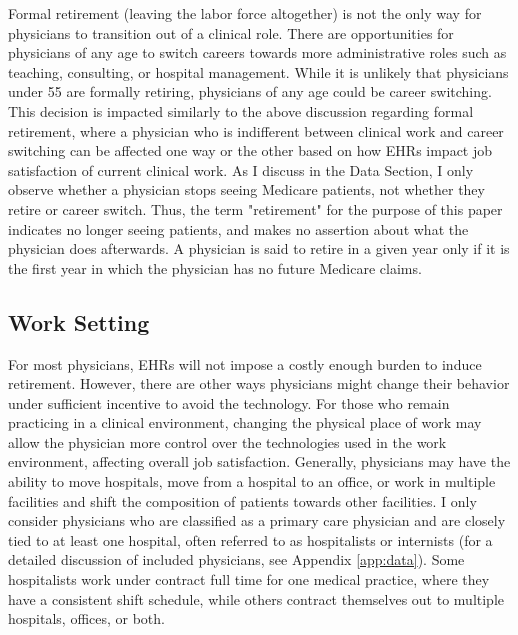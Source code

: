 \documentclass[11pt]{article}
\begin{document}
Formal retirement (leaving the labor force altogether) is not the only way for physicians to transition out of a clinical role. There are opportunities for physicians of any age to switch careers towards more administrative roles such as teaching, consulting, or hospital management. While it is unlikely that physicians under 55 are formally retiring, physicians of any age could be career switching. This decision is impacted similarly to the above discussion regarding formal retirement, where a physician who is indifferent between clinical work and career switching can be affected one way or the other based on how EHRs impact job satisfaction of current clinical work. As I discuss in the Data Section, I only observe whether a physician stops seeing Medicare patients, not whether they retire or career switch. Thus, the term "retirement" for the purpose of this paper indicates no longer seeing patients, and makes no assertion about what the physician does afterwards. A physician is said to retire in a given year only if it is the first year in which the physician has no future Medicare claims.



\subsection{Work Setting}

For most physicians, EHRs will not impose a costly enough burden to induce retirement. However, there are other ways physicians might change their behavior under sufficient incentive to avoid the technology. For those who remain practicing in a clinical environment, changing the physical place of work may allow the physician more control over the technologies used in the work environment, affecting overall job satisfaction. Generally, physicians may have the ability to move hospitals, move from a hospital to an office, or work in multiple facilities and shift the composition of patients towards other facilities. I only consider physicians who are classified as a primary care physician and are closely tied to at least one hospital, often referred to as hospitalists or internists (for a detailed discussion of included physicians, see Appendix \ref{app:data}). Some hospitalists work under contract full time for one medical practice, where they have a consistent shift schedule, while others contract themselves out to multiple hospitals, offices, or both. 
\end{document}
